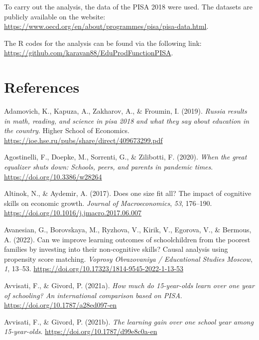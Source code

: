 \documentclass[
]{article}
\newlength{\cslhangindent}
\newenvironment{CSLReferences}[2] %
 {\begin{list}{}{%
  \setlength{\itemindent}{0pt}
  \setlength{\leftmargin}{0pt}
  \setlength{\parsep}{0pt}
  \ifodd #1
   \setlength{\leftmargin}{\cslhangindent}
   \setlength{\itemindent}{-1\cslhangindent}
  \fi
  \setlength{\itemsep}{#2\baselineskip}}}
 {\end{list}}
\begin{document}
To carry out the analysis, the data of the PISA 2018 were used. The
datasets are publicly available on the website:
\url{https://www.oecd.org/en/about/programmes/pisa/pisa-data.html}.

The R codes for the analysis can be found via the following link:\\
\url{https://github.com/karavan88/EduProdFunctionPISA}.

\section{References}\label{references}

\label{refs}
\begin{CSLReferences}{1}{0}
Adamovich, K., Kapuza, A., Zakharov, A., \& Froumin, I. (2019).
\emph{Russia results in math, reading, and science in pisa 2018 and what
they say about education in the country}. Higher School of Economics.
\url{https://ioe.hse.ru/pubs/share/direct/409673299.pdf}

Agostinelli, F., Doepke, M., Sorrenti, G., \& Zilibotti, F. (2020).
\emph{When the great equalizer shuts down: Schools, peers, and parents
in pandemic times}. \url{https://doi.org/10.3386/w28264}

Altinok, N., \& Aydemir, A. (2017). Does one size fit all? The impact of
cognitive skills on economic growth. \emph{Journal of Macroeconomics},
\emph{53}, 176--190. \url{https://doi.org/10.1016/j.jmacro.2017.06.007}

Avanesian, G., Borovskaya, M., Ryzhova, V., Kirik, V., Egorova, V., \&
Bermous, A. (2022). Can we improve learning outcomes of schoolchildren
from the poorest families by investing into their non-cognitive skills?
Causal analysis using propensity score matching. \emph{Voprosy
Obrazovaniya / Educational Studies Moscow}, \emph{1}, 13--53.
\url{https://doi.org/10.17323/1814-9545-2022-1-13-53}

Avvisati, F., \& Givord, P. (2021a). \emph{How much do 15-year-olds
learn over one year of schooling? An international comparison based on
PISA}. \url{https://doi.org/10.1787/a28ed097-en}

Avvisati, F., \& Givord, P. (2021b). \emph{The learning gain over one
school year among 15-year-olds}.
\url{https://doi.org/10.1787/d99e8c0a-en}


\end{CSLReferences}
\end{document}
